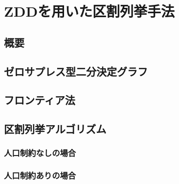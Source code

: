\chapter{ZDDを用いた区割列挙手法} \label{chapter:3}

\section{概要}

\section{ゼロサプレス型二分決定グラフ}

\section{フロンティア法}

\section{区割列挙アルゴリズム}

\subsection{人口制約なしの場合}

\subsection{人口制約ありの場合}
